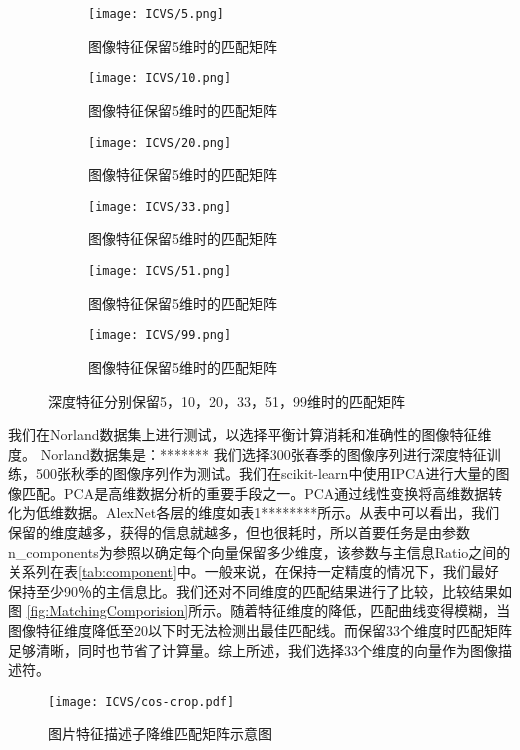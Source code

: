 \begin{figure}[h]
  \centering
  \begin{subfigure}[h]{0.23\textwidth}
    \texttt{[image: ICVS/5.png]}
    \caption{图像特征保留5维时的匹配矩阵}
  \end{subfigure}
  \begin{subfigure}[h]{0.23\textwidth}
    \texttt{[image: ICVS/10.png]}
    \caption{图像特征保留5维时的匹配矩阵}
  \end{subfigure}
  \begin{subfigure}[h]{0.23\textwidth}
    \texttt{[image: ICVS/20.png]}
    \caption{图像特征保留5维时的匹配矩阵}
  \end{subfigure}
  \begin{subfigure}[h]{0.23\textwidth}
    \texttt{[image: ICVS/33.png]}
    \caption{图像特征保留5维时的匹配矩阵}
  \end{subfigure}
  \begin{subfigure}[h]{0.23\textwidth}
    \texttt{[image: ICVS/51.png]}
    \caption{图像特征保留5维时的匹配矩阵}
  \end{subfigure}
  \begin{subfigure}[h]{0.23\textwidth}
    \texttt{[image: ICVS/99.png]}
    \caption{图像特征保留5维时的匹配矩阵}
  \end{subfigure}
 \caption{深度特征分别保留5，10，20，33，51，99维时的匹配矩阵}
 \label{fig:MatchingComparision}
\end{figure}

我们在Norland数据集上进行测试，以选择平衡计算消耗和准确性的图像特征维度。
Norland数据集是：*******
我们选择300张春季的图像序列进行深度特征训练，500张秋季的图像序列作为测试。我们在scikit-learn中使用IPCA进行大量的图像匹配。PCA是高维数据分析的重要手段之一。PCA通过线性变换将高维数据转化为低维数据。AlexNet各层的维度如表1********所示。从表中可以看出，我们保留的维度越多，获得的信息就越多，但也很耗时，所以首要任务是由参数n\_components为参照以确定每个向量保留多少维度，该参数与主信息Ratio之间的关系列在表\ref{tab:component}中。一般来说，在保持一定精度的情况下，我们最好保持至少90％的主信息比。我们还对不同维度的匹配结果进行了比较，比较结果如图 \ref{fig:MatchingComporision}所示。随着特征维度的降低，匹配曲线变得模糊，当图像特征维度降低至20以下时无法检测出最佳匹配线。而保留33个维度时匹配矩阵足够清晰，同时也节省了计算量。综上所述，我们选择33个维度的向量作为图像描述符。
\begin{figure}[h]
  \centering
  \texttt{[image: ICVS/cos-crop.pdf]}
  \caption{图片特征描述子降维匹配矩阵示意图}
  \label{fig:cos}
\end{figure}

